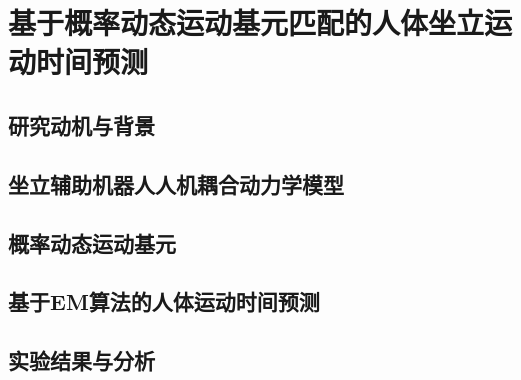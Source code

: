 \chapter{基于概率动态运动基元匹配的人体坐立运动时间预测}

\section{研究动机与背景}    

\section{坐立辅助机器人人机耦合动力学模型}  

\section{概率动态运动基元}   

\section{基于EM算法的人体运动时间预测}

\section{实验结果与分析}
